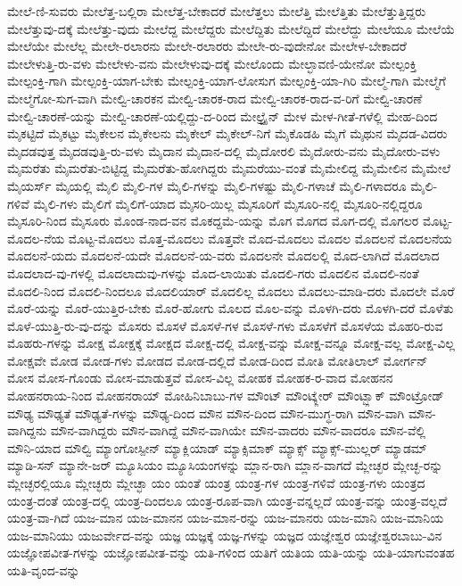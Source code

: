 {ಮೇಲೆ-ಣಿ-ಸುವರು
ಮೇಲೆತ್ತ-ಬಲ್ಲಿರಾ
ಮೇಲೆತ್ತ-ಬೇಕಾದರೆ
ಮೇಲೆತ್ತಲು
ಮೇಲೆತ್ತಿ
ಮೇಲೆತ್ತಿತು
ಮೇಲೆತ್ತುತ್ತಿದ್ದರು
ಮೇಲೆತ್ತುವು-ದಕ್ಕೆ
ಮೇಲೆತ್ತು-ವುದು
ಮೇಲೆದ್ದ
ಮೇಲೆದ್ದರು
ಮೇಲೆದ್ದಿತು
ಮೇಲೆದ್ದಿದೆ
ಮೇಲೆದ್ದು
ಮೇಲೆಯೂ
ಮೇಲೆಯೆ
ಮೇಲೆಯೇ
ಮೇಲೆಲ್ಲ
ಮೇಲೇ-ರಲಾರನು
ಮೇಲೇ-ರಲಾರರು
ಮೇಲೇ-ರು-ವುದೇನೋ
ಮೇಲೇಳ-ಬೇಕಾದರೆ
ಮೇಲೇಳುತ್ತಿ-ರು-ವಳು
ಮೇಲೇಳು-ವನು
ಮೇಲೇಳುವು-ದಕ್ಕೆ
ಮೇಲೊಂದು
ಮೇಲ್ಛಾವಣಿ-ಯೇನೋ
ಮೇಲ್ಪಂಕ್ತಿ
ಮೇಲ್ಪಂಕ್ತಿ-ಗಾಗಿ
ಮೇಲ್ಪಂಕ್ತಿ-ಯಾಗ-ಬೇಕು
ಮೇಲ್ಪಂಕ್ತಿ-ಯಾಗ-ಲೋಸುಗ
ಮೇಲ್ಪಂಕ್ತಿ-ಯಾ-ಗಿರಿ
ಮೇಲ್ಮೆ-ಗಾಗಿ
ಮೇಲ್ಮೆಗೆ
ಮೇಲ್ಮೆಗೋ-ಸುಗ-ವಾಗಿ
ಮೇಲ್ವಿ-ಚಾರಕನ
ಮೇಲ್ವಿ-ಚಾರಕ-ರಾದ
ಮೇಲ್ವಿ-ಚಾರಕ-ರಾದ-ವ-ರಿಗೆ
ಮೇಲ್ವಿ-ಚಾರಣೆ
ಮೇಲ್ವಿ-ಚಾರಣೆ-ಯನ್ನು
ಮೇಲ್ವಿ-ಚಾರಣೆ-ಯಲ್ಲಿದ್ದು-ದ-ರಿಂದ
ಮೇಲ್ಟ್ರೈನ್
ಮೇಳ
ಮೇಳ-ಗೀತೆ-ಗಳೆಲ್ಲಿ
ಮೇಹ-ದಿಂದ
ಮೈಕಟ್ಟಿದೆ
ಮೈಕಟ್ಟು
ಮೈಕೇಲನ
ಮೈಕೇಲನು
ಮೈಕೇಲ್
ಮೈಕೇಲ್-ನಿಗೆ
ಮೈಕೊಡಹಿ
ಮೈಗೆ
ಮೈಥುನ
ಮೈದಡ-ವಿದರು
ಮೈದಡವುತ್ತ
ಮೈದಡವುತ್ತಿ-ರು-ವಳು
ಮೈದಾನ
ಮೈದಾನ-ದಲ್ಲಿ
ಮೈದೋರಲಿ
ಮೈದೋರು-ವನು
ಮೈದೋರು-ವಳು
ಮೈಮರೆತು
ಮೈಮರೆತು-ಬಿಟ್ಟಿದ್ದ
ಮೈಮರೆತು-ಹೋಗಿದ್ದರು
ಮೈಮರೆಯು-ವಂತೆ
ಮೈಮೇಲಿದ್ದ
ಮೈಮೇಲಿನ
ಮೈಮೇಲೆ
ಮೈಯರ್ಸ್
ಮೈಯಲ್ಲಿ
ಮೈಲಿ
ಮೈಲಿ-ಗಳ
ಮೈಲಿ-ಗಳನ್ನು
ಮೈಲಿ-ಗಳಷ್ಟು
ಮೈಲಿ-ಗಳಾಚೆ
ಮೈಲಿ-ಗಳಾದರೂ
ಮೈಲಿ-ಗಳಿವೆ
ಮೈಲಿ-ಗಳು
ಮೈಲಿಗೆ
ಮೈಲಿಗೆ-ಯಾದ
ಮೈಸರಿ-ಯಿಲ್ಲ
ಮೈಸೂರಿಗೆ
ಮೈಸೂರಿ-ನಲ್ಲಿ
ಮೈಸೂರಿ-ನಲ್ಲಿದ್ದರೂ
ಮೈಸೂರಿ-ನಿಂದ
ಮೈಸೂರು
ಮೊಂಡ-ನಾದ-ವನ
ಮೊಕದ್ದಮೆ-ಯನ್ನು
ಮೊಗ
ಮೊಗದ
ಮೊಗ-ದಲ್ಲಿ
ಮೊಗಲರ
ಮೊಟ್ಟ-ಮೊದಲ-ನೆಯ
ಮೊಟ್ಟ-ಮೊದಲು
ಮೊತ್ತ-ಮೊದಲು
ಮೊತ್ತವೇ
ಮೊದ-ಮೊದಲು
ಮೊದಲ
ಮೊದಲನೆ
ಮೊದಲನೆಯ
ಮೊದಲನೆ-ಯದು
ಮೊದಲನೆ-ಯದೇ
ಮೊದಲನೆ-ಯ-ವರು
ಮೊದಲನೇ
ಮೊದಲಲ್ಲಿ
ಮೊದ-ಲಾಗಿದೆ
ಮೊದಲಾದ
ಮೊದಲಾದ-ವು-ಗಳಲ್ಲಿ
ಮೊದಲಾದುವು-ಗಳನ್ನು
ಮೊದ-ಲಾಯಿತು
ಮೊದಲಿ-ಗರು
ಮೊದಲಿನ
ಮೊದಲಿ-ನಂತೆ
ಮೊದಲಿ-ನಿಂದ
ಮೊದಲಿ-ನಿಂದಲೂ
ಮೊದಲಿಯಾರ್
ಮೊದಲಿಲ್ಲ
ಮೊದಲು
ಮೊದಲು-ಮಾಡಿ-ದರು
ಮೊದಲೇ
ಮೊರೆ
ಮೊರೆ-ಯನ್ನು
ಮೊರೆ-ಯುತ್ತಿರ-ಬೇಕು
ಮೊರೆ-ಹೋಗು
ಮೊಲದ
ಮೊಲ-ವನ್ನು
ಮೊಳಗಿ-ದರು
ಮೊಳಗಿ-ದರೆ
ಮೊಳೆತು
ಮೊಳೆ-ಯುತ್ತಿ-ರು-ವು-ದನ್ನು
ಮೊಸರು
ಮೊಸಳೆ
ಮೊಸಳೆ-ಗಳ
ಮೊಸಳೆ-ಗಳು
ಮೊಸಳೆಗೆ
ಮೊಸಳೆಯ
ಮೊಹರಿ-ರುವ
ಮೊಹರು-ಗಳನ್ನು
ಮೋಕ್ಷ
ಮೋಕ್ಷಕ್ಕೆ
ಮೋಕ್ಷದ
ಮೋಕ್ಷ-ದಲ್ಲಿ
ಮೋಕ್ಷ-ವನ್ನು
ಮೋಕ್ಷ-ವನ್ನೂ
ಮೋಕ್ಷ-ವಲ್ಲ
ಮೋಕ್ಷ-ವಿಲ್ಲ
ಮೋಕ್ಷವೇ
ಮೋಡ
ಮೋಡ-ಗಳು
ಮೋಡದ
ಮೋಡ-ದಲ್ಲಿದೆ
ಮೋಡ-ದಿಂದ
ಮೋತಿ
ಮೋತಿಲಾಲ್
ಮೋರ್ಗನ್
ಮೋಸ
ಮೋಸ-ಗೊಂಡು
ಮೋಸ-ಮಾಡುತ್ತವೆ
ಮೋಸ-ವಿಲ್ಲ
ಮೋಹಕ
ಮೋಹಕ-ರ-ವಾದ
ಮೋಹನನ
ಮೋಹನರಾಯ-ನಿಂದ
ಮೋಹನರಾಯ್
ಮೋಹಿನಿಬಾಬು-ಗಳ
ಮೌಂಟ್
ಮೌಂಟ್ಕ್ಲೇರ್
ಮೌಂಟ್ಬ್ಲಾಕ್
ಮೌಂಟ್ರೋಡ್
ಮೌಢ್ಯ
ಮೌಢ್ಯತೆ
ಮೌಢ್ಯತೆ-ಗಳನ್ನು
ಮೌಢ್ಯ-ದಿಂದ
ಮೌನ
ಮೌನ-ದಿಂದ
ಮೌನ-ಮುಗ್ಧ-ರಾಗಿ
ಮೌನ-ವಾಗಿ
ಮೌನ-ವಾಗಿದ್ದನು
ಮೌನ-ವಾಗಿದ್ದರು
ಮೌನ-ವಾಗಿದ್ದೆ
ಮೌನ-ವಾಗಿಯೇ
ಮೌನ-ವಾದರು
ಮೌನ-ವಾದರೂ
ಮೌನ-ವೆಲ್ಲಿ
ಮೌನಿ-ಯಾದ
ಮೌಲ್ವಿ
ಮ್ಯಾಂಗೋಸ್ಪೀನ್
ಮ್ಯಾಕ್ಲಿಯಾಡ್
ಮ್ಯಾಕ್ಸಿಮಾಕ್
ಮ್ಯಾಕ್ಸ್
ಮ್ಯಾಕ್ಸ್-ಮುಲ್ಲರ್
ಮ್ಯಾಡಮ್
ಮ್ಯಾಡಿ-ಸನ್
ಮ್ಯಾನೇ-ಜರ್
ಮ್ಯೂಸಿಯಂ
ಮ್ಯೂಸಿಯಂಗಳನ್ನು
ಮ್ಲಾನ-ರಾಗಿ
ಮ್ಲಾನ-ವಾಗದೆ
ಮ್ಲೇಚ್ಛರ
ಮ್ಲೇಚ್ಛ-ರನ್ನು
ಮ್ಲೇಚ್ಛರಲ್ಲಿಯೂ
ಮ್ಲೇಚ್ಛರು
ಮ್ಲೇಚ್ಛಾ
ಯಂ
ಯಂತೆ
ಯಂತ್ರ
ಯಂತ್ರ-ಗಳ
ಯಂತ್ರ-ಗಳಿವೆ
ಯಂತ್ರ-ಗಳು
ಯಂತ್ರದ
ಯಂತ್ರ-ದಂತೆ
ಯಂತ್ರ-ದಲ್ಲಿ
ಯಂತ್ರ-ದಿಂದಲೂ
ಯಂತ್ರ-ರೂಪ-ವಾಗಿ
ಯಂತ್ರ-ವನ್ನಲ್ಲದೆ
ಯಂತ್ರ-ವನ್ನು
ಯಂತ್ರ-ವಲ್ಲದೆ
ಯಂತ್ರ-ವಾ-ಗಿದೆ
ಯಜ-ಮಾನ
ಯಜ-ಮಾನನ
ಯಜ-ಮಾನ-ರನ್ನು
ಯಜ-ಮಾನರು
ಯಜ-ಮಾನಿ
ಯಜ-ಮಾನಿಯ
ಯಜ-ಮಾನಿಯು
ಯಜುರ್ವೇದ-ವನ್ನು
ಯಜ್ಞ
ಯಜ್ಞಕ್ಕೆ
ಯಜ್ಞ-ಗಳನ್ನು
ಯಜ್ಞದ
ಯಜ್ಞೇಶ್ವರ
ಯಜ್ಞೇಶ್ವರಬಾಬು-ವಿನ
ಯಜ್ಞೋಪವೀತ-ಗಳನ್ನು
ಯಜ್ಞೋಪವೀತ-ವನ್ನು
ಯತಿ-ಗಳಿಂದ
ಯತಿಗೆ
ಯತಿಯ
ಯತಿ-ಯನ್ನು
ಯತಿ-ಯಾಗುವಂತಹ
ಯತಿ-ವೃಂದ-ವನ್ನು
}
